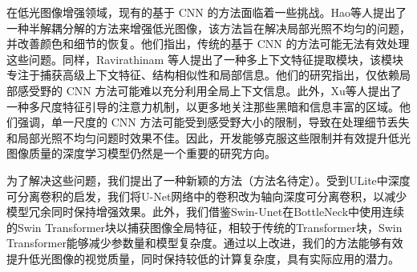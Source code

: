 \documentclass[a4paper, 10pt]{article}
\begin{document}
		在低光图像增强领域，现有的基于 CNN 的方法面临着一些挑战。Hao等人\cite{hao2020low}提出了一种半解耦分解的方法来增强低光图像，该方法旨在解决局部光照不均匀的问题，并改善颜色和细节的恢复。他们指出，传统的基于 CNN 的方法可能无法有效处理这些问题。同样，Ravirathinam 等人\cite{ravirathinam2021c}提出了一种多上下文特征提取模块，该模块专注于捕获高级上下文特征、结构相似性和局部信息。他们的研究指出，仅依赖局部感受野的 CNN 方法可能难以充分利用全局上下文信息。此外，Xu等人\cite{xu2021novel}提出了一种多尺度特征引导的注意力机制，以更多地关注那些黑暗和信息丰富的区域。他们强调，单一尺度的 CNN 方法可能受到感受野大小的限制，导致在处理细节丢失和局部光照不均匀问题时效果不佳。因此，开发能够克服这些限制并有效提升低光图像质量的深度学习模型仍然是一个重要的研究方向。
		
%		
%		
%		
%		


%		
		
		为了解决这些问题，我们提出了一种新颖的方法（方法名待定）。受到ULite\cite{dinh20231m}中深度可分离卷积的启发，我们将U-Net网络中的卷积改为轴向深度可分离卷积，以减少模型冗余同时保持增强效果。此外，我们借鉴Swin-Unet\cite{cao2022swin}在BottleNeck中使用连续的Swin Transformer块以捕获图像全局特征，相较于传统的Transformer块，Swin Transformer能够减少参数量和模型复杂度。通过以上改进，我们的方法能够有效提升低光图像的视觉质量，同时保持较低的计算复杂度，具有实际应用的潜力。
		
\end{document}
